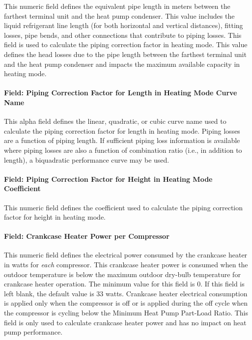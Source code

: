 This numeric field defines the equivalent pipe length in meters between the farthest terminal unit and the heat pump condenser. This value includes the liquid refrigerant line length (for both horizontal and vertical distances), fitting losses, pipe bends, and other connections that contribute to piping losses. This field is used to calculate the piping correction factor in heating mode. This value defines the head losses due to the pipe length between the farthest terminal unit and the heat pump condenser and impacts the maximum available capacity in heating mode.

\paragraph{Field: Piping Correction Factor for Length in Heating Mode Curve Name}\label{field-piping-correction-factor-for-length-in-heating-mode-curve-name}

This alpha field defines the linear, quadratic, or cubic curve name used to calculate the piping correction factor for length in heating mode. Piping losses are a function of piping length. If sufficient piping loss information is available where piping losses are also a function of combination ratio (i.e., in addition to length), a biquadratic performance curve may be used.

\paragraph{Field: Piping Correction Factor for Height in Heating Mode Coefficient}\label{field-piping-correction-factor-for-height-in-heating-mode-coefficient}

This numeric field defines the coefficient used to calculate the piping correction factor for height in heating mode.

\paragraph{Field: Crankcase Heater Power per Compressor}\label{field-crankcase-heater-power-per-compressor-000}

This numeric field defines the electrical power consumed by the crankcase heater in watts for \emph{each} compressor. This crankcase heater power is consumed when the outdoor temperature is below the maximum outdoor dry-bulb temperature for crankcase heater operation. The minimum value for this field is 0. If this field is left blank, the default value is 33 watts. Crankcase heater electrical consumption is applied only when the compressor is off or is applied during the off cycle when the compressor is cycling below the Minimum Heat Pump Part-Load Ratio. This field is only used to calculate crankcase heater power and has no impact on heat pump performance.

